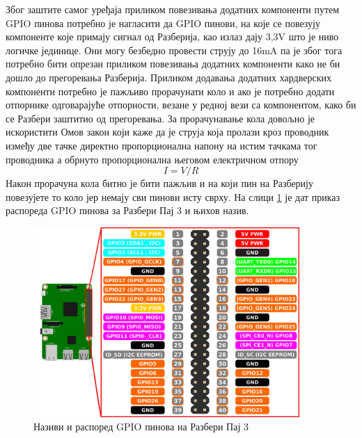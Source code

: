 \documentclass[12pt,oneside]{memoir}
\theoremstyle{remark}
\begin{document}
Због заштите самог уређаја приликом повезивања додатних компоненти путем GPIO пинова потребно је нагласити да GPIO пинови, на које се повезују компоненте које примају сигнал од Разберија, као излаз дају 3,3V што је ниво логичке јединице. Они могу безбедно провести струју до 16mA па је због тога потребно бити опрезан приликом повезивања додатних компоненти како не би дошло до прегоревања Разберија. Приликом додавања додатних хардверских компоненти потребно је пажљиво прорачунати коло и ако је потребно додати отпорнике одговарајуће отпорности, везане у редној вези са компонентом, како би се Разбери заштитио од прегоревања. За прорачунавање кола довољно је искористити Омов закон који каже да је струја која пролази кроз проводник између две тачке директно пропорционална напону на истим тачкама тог про\-водника а обрнуто пропорционална његовом електричном отпору $$ I = V/R $$ Након прорачуна кола битно је бити пажљив и на који пин на Разберију повезујете то коло јер немају сви пинови исту сврху. На слици \ref{fig:rpigpioimg} је дат приказ распореда GPIO пинова за Разбери Пај 3 и њихов назив. 

\begin{figure}[!ht]
\centering
\includegraphics[width=0.9\textwidth]{slike/rpigpio.png}
\caption{Називи и распоред GPIO пинова на Разбери Пај 3}
\label{fig:rpigpioimg}
\end{figure}
\end{document}
